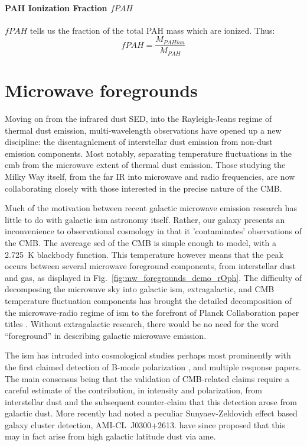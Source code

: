       \paragraph{PAH Ionization Fraction $fPAH$}
       $fPAH$ tells us the fraction of the total PAH mass which are ionized. Thus:
         \begin{equation}
           fPAH = \frac{M_{PAHion}}{M_{PAH}}
         \end{equation}


\section{Microwave foregrounds}
    Moving on from the infrared dust SED, into the Rayleigh-Jeans regime of thermal dust emission, multi-wavelength observations have opened up a new discipline: the disentagnlement of interstellar dust emission from non-dust emission components. Most notably, separating temperature fluctuations in the \acrlong{cmb} from the microwave extent of thermal dust emission. Those studying the Milky Way itself, from the far IR into microwave and radio frequencies, are now collaborating closely with those interested in the precise nature of the CMB.

    Much of the motivation between recent galactic microwave emission research has little to do with galactic \acrshort{ism} astronomy itself. Rather, our galaxy presents an inconvenience to observational cosmology in that it 'contaminates' observations of the CMB. The avereage \acrshort{sed} of the CMB is simple enough to model, with a 2.725~K blackbody function. This temperature however means that the peak occurs between several microwave foreground components, from interstellar dust and gas, as displayed in Fig.~\ref{fig:mw_foregrounds_demo_rOph}. The difficulty of decomposing the microwave sky into galactic \acrshort{ism}, extragalactic, and CMB temperature fluctuation components has brought the detailed decomposition of the microwave-radio regime of \acrshort{ism} to the forefront of Planck Collaboration paper titles \citep{planckEarly11I,planck2013I,planck2015I}. Without extragalactic research, there would be no need for the word ``foreground'' in describing galactic microwave emission.

    The \acrshort{ism} has intruded into cosmological studies perhaps most prominently with the first claimed detection of B-mode polarization \citep{hanson13, bicep214, flauger14}, and multiple response papers. The main consensus being that the validation of CMB-related claims require a careful estimate of the contribution, in intensity and polarization, from interstellar dust and the subsequent counter-claim that this detection arose from galactic dust\citep{planckIntL17, sheehy17}. More recently \cite{shimwell12} had noted a peculiar Sunyaev-Zeldovich effect based galaxy cluster detection, AMI-CL~J0300+2613. \cite{perrott18} have since proposed that this may in fact arise from high galactic latitude dust via \acrlong{ame}.

